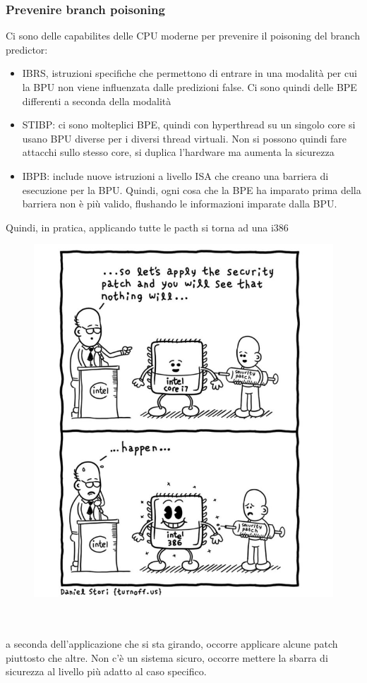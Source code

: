 \documentclass[12pt, oneside]{extbook} %
\begin{document}
\subsubsection{Prevenire branch poisoning}
Ci sono delle capabilites delle CPU moderne per prevenire il poisoning del branch predictor:
\begin{itemize}
\item IBRS, istruzioni specifiche che permettono di entrare in una modalità per cui la BPU non viene influenzata dalle predizioni false. Ci sono quindi delle BPE differenti a seconda della modalità
\item STIBP: ci sono molteplici BPE, quindi con hyperthread su un singolo core si usano BPU diverse per i diversi thread virtuali. Non si possono quindi fare attacchi sullo stesso core, si duplica l'hardware ma aumenta la sicurezza
\item IBPB: include nuove istruzioni a livello ISA che creano una barriera di esecuzione per la BPU. Quindi, ogni cosa che la BPE ha imparato prima della barriera non è più valido, flushando le informazioni imparate dalla BPU.
\end{itemize}
Quindi, in pratica, applicando tutte le pacth si torna ad una i386\\
\begin{figure}[!h]
	\includegraphics[scale=0.3]{immagini/from_i7_to_i386.png}
\end{figure}
\\\\
a seconda dell'applicazione che si sta girando, occorre applicare alcune patch piuttosto che altre. Non c'è un sistema sicuro, occorre mettere la sbarra di sicurezza al livello più adatto al caso specifico.
\end{document}
